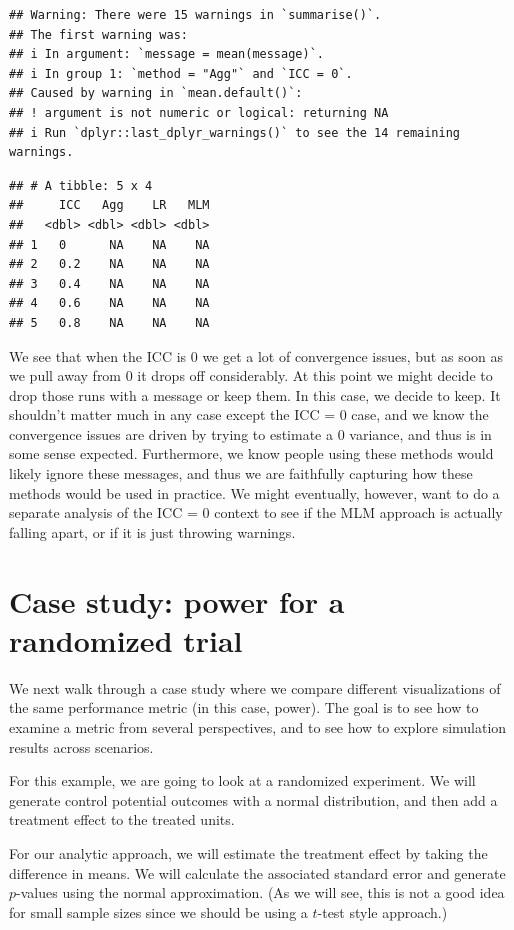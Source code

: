 \documentclass[
]{book}
\begin{document}
\begin{verbatim}
## Warning: There were 15 warnings in `summarise()`.
## The first warning was:
## i In argument: `message = mean(message)`.
## i In group 1: `method = "Agg"` and `ICC = 0`.
## Caused by warning in `mean.default()`:
## ! argument is not numeric or logical: returning NA
## i Run `dplyr::last_dplyr_warnings()` to see the 14 remaining warnings.
\end{verbatim}

\begin{verbatim}
## # A tibble: 5 x 4
##     ICC   Agg    LR   MLM
##   <dbl> <dbl> <dbl> <dbl>
## 1   0      NA    NA    NA
## 2   0.2    NA    NA    NA
## 3   0.4    NA    NA    NA
## 4   0.6    NA    NA    NA
## 5   0.8    NA    NA    NA
\end{verbatim}

We see that when the ICC is 0 we get a lot of convergence issues, but as soon as we pull away from 0 it drops off considerably.
At this point we might decide to drop those runs with a message or keep them.
In this case, we decide to keep.
It shouldn't matter much in any case except the ICC = 0 case, and we know the convergence issues are driven by trying to estimate a 0 variance, and thus is in some sense expected.
Furthermore, we know people using these methods would likely ignore these messages, and thus we are faithfully capturing how these methods would be used in practice.
We might eventually, however, want to do a separate analysis of the ICC = 0 context to see if the MLM approach is actually falling apart, or if it is just throwing warnings.

\section{Case study: power for a randomized trial}\label{case-study-power-for-a-randomized-trial}

We next walk through a case study where we compare different visualizations of the same performance metric (in this case, power).
The goal is to see how to examine a metric from several perspectives, and to see how to explore simulation results across scenarios.

For this example, we are going to look at a randomized experiment.
We will generate control potential outcomes with a normal distribution, and then add a treatment effect to the treated units.

For our analytic approach, we will estimate the
treatment effect by taking the difference in means.
We will calculate the associated standard error and generate \(p\)-values using the normal
approximation.
(As we will see, this is not a good idea for small sample sizes since we should be using a \(t\)-test style approach.)
\end{document}
